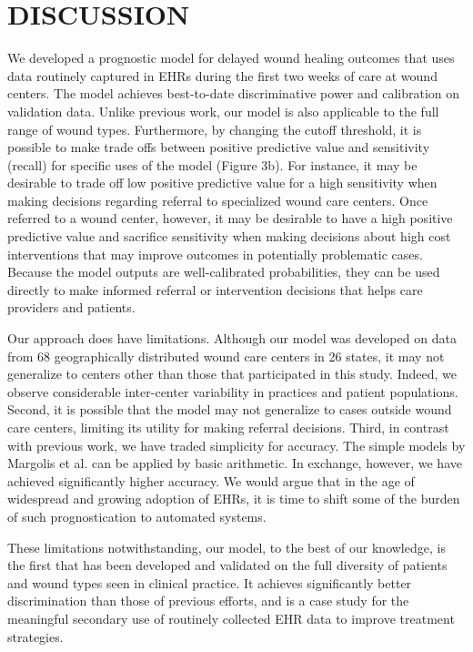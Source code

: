 \section{DISCUSSION}

We developed a prognostic model for delayed wound healing outcomes
that uses data routinely captured in EHRs during the first two weeks
of care at wound centers.  The model achieves best-to-date
discriminative power and calibration on validation data.  Unlike
previous work, our model is also applicable to the full range of wound
types.  Furthermore, by changing the cutoff threshold, it is possible
to make trade offs between positive predictive value and sensitivity
(recall) for specific uses of the model (Figure 3b).  For instance, it
may be desirable to trade off low positive predictive value for a high
sensitivity when making decisions regarding referral to specialized
wound care centers.  Once referred to a wound center, however, it may
be desirable to have a high positive predictive value and sacrifice
sensitivity when making decisions about high cost interventions that
may improve outcomes in potentially problematic cases.  Because the
model outputs are well-calibrated probabilities, they can be used
directly to make informed referral or intervention decisions that
helps care providers and patients.

Our approach does have limitations. Although our model was developed
on data from 68 geographically distributed wound care centers in 26
states, it may not generalize to centers other than those that
participated in this study.  Indeed, we observe considerable
inter-center variability in practices and patient populations.
Second, it is possible that the model may not generalize to cases
outside wound care centers, limiting its utility for making referral
decisions.  Third, in contrast with previous work, we have traded
simplicity for accuracy.  The simple models by Margolis et al. can be
applied by basic arithmetic.  In exchange, however, we have achieved
significantly higher accuracy.  We would argue that in the age of
widespread and growing adoption of EHRs, it is time to shift some of
the burden of such prognostication to automated systems.

These limitations notwithstanding, our model, to the best of our
knowledge, is the first that has been developed and validated on the
full diversity of patients and wound types seen in clinical practice.
It achieves significantly better discrimination than those of previous
efforts, and is a case study for the meaningful secondary use of
routinely collected EHR data to improve treatment strategies.


